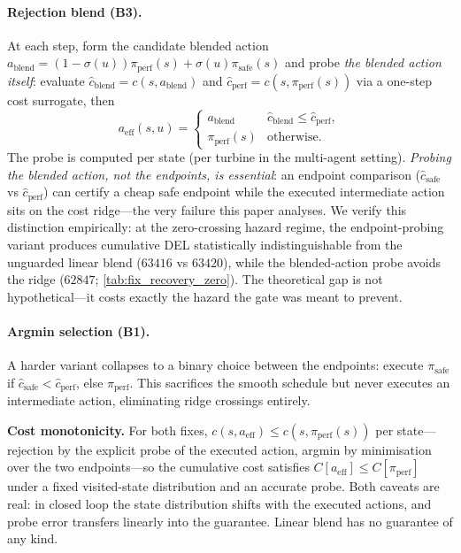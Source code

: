 \documentclass{article}
\begin{document}
\paragraph{Rejection blend (B3).}
At each step, form the candidate blended action $a_{\mathrm{blend}} = (1-\sigma(u))\pi_{\mathrm{perf}}(s) + \sigma(u)\pi_{\mathrm{safe}}(s)$ and probe \emph{the blended action itself}: evaluate $\hat c_{\mathrm{blend}} = c(s, a_{\mathrm{blend}})$ and $\hat c_{\mathrm{perf}} = c(s, \pi_{\mathrm{perf}}(s))$ via a one-step cost surrogate, then
\begin{equation}
    a_{\mathrm{eff}}(s,u) =
    \begin{cases}
        a_{\mathrm{blend}} & \hat c_{\mathrm{blend}} \le \hat c_{\mathrm{perf}}, \\
        \pi_{\mathrm{perf}}(s) & \text{otherwise.}
    \end{cases}
\label{eq:rejection}
\end{equation}
The probe is computed per state (per turbine in the multi-agent setting).
\emph{Probing the blended action, not the endpoints, is essential}: an endpoint comparison ($\hat c_{\mathrm{safe}}$ vs $\hat c_{\mathrm{perf}}$) can certify a cheap safe endpoint while the executed intermediate action sits on the cost ridge---the very failure this paper analyses.
We verify this distinction empirically: at the zero-crossing hazard regime, the endpoint-probing variant produces cumulative DEL statistically indistinguishable from the unguarded linear blend ($63416$ vs $63420$), while the blended-action probe avoids the ridge ($62847$; \cref{tab:fix_recovery_zero}).
The theoretical gap is not hypothetical---it costs exactly the hazard the gate was meant to prevent.

\paragraph{Argmin selection (B1).}
A harder variant collapses to a binary choice between the endpoints: execute $\pi_{\mathrm{safe}}$ if $\hat c_{\mathrm{safe}} < \hat c_{\mathrm{perf}}$, else $\pi_{\mathrm{perf}}$.
This sacrifices the smooth schedule but never executes an intermediate action, eliminating ridge crossings entirely.

\textbf{Cost monotonicity.}
For both fixes, $c(s, a_{\mathrm{eff}}) \le c(s, \pi_{\mathrm{perf}}(s))$ per state---rejection by the explicit probe of the executed action, argmin by minimisation over the two endpoints---so the cumulative cost satisfies $C[a_{\mathrm{eff}}] \le C[\pi_{\mathrm{perf}}]$ under a fixed visited-state distribution and an accurate probe.
Both caveats are real: in closed loop the state distribution shifts with the executed actions, and probe error transfers linearly into the guarantee.
Linear blend has no guarantee of any kind.
\end{document}
